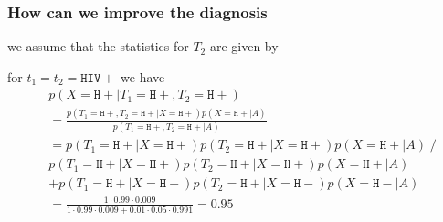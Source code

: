 \documentclass[notheorems, aspectratio=54]{beamer}
\begin{document}
\begin{frame}
    \frametitle{How can we improve the diagnosis}

    we assume that the statistics for $T_2$ are given by

    \flushleft
    for $t_1 = t_2 = \mathtt{HIV+}$ we have
    \begin{align}
    \nonumber & p(X=\mathtt{H+}|T_1=\mathtt{H+},T_2=\mathtt{H+}) \\
    \nonumber &= \frac{p(T_1=\mathtt{H+}, T_2=\mathtt{H+}|X=\mathtt{H+})p(X=\mathtt{H+}|A)}{p(T_1=\mathtt{H+}, T_2=\mathtt{H+}|A)} \\
    \nonumber &= p(T_1=\mathtt{H+}|X=\mathtt{H+})p(T_2=\mathtt{H+}|X=\mathtt{H+})p(X=\mathtt{H+}|A) \;/ \\
    \nonumber & p(T_1=\mathtt{H+}|X=\mathtt{H+})p(T_2=\mathtt{H+}|X=\mathtt{H+})p(X=\mathtt{H+}|A) \\
    \nonumber & + p(T_1=\mathtt{H+}|X=\mathtt{H-})p(T_2=\mathtt{H+}|X=\mathtt{H-})p(X=\mathtt{H-}|A) \\
    \nonumber &= \frac{1 \cdot 0.99 \cdot 0.009}{1 \cdot 0.99 \cdot 0.009 + 0.01 \cdot 0.05 \cdot 0.991} = 0.95
    \end{align}
\end{frame}
\end{document}
